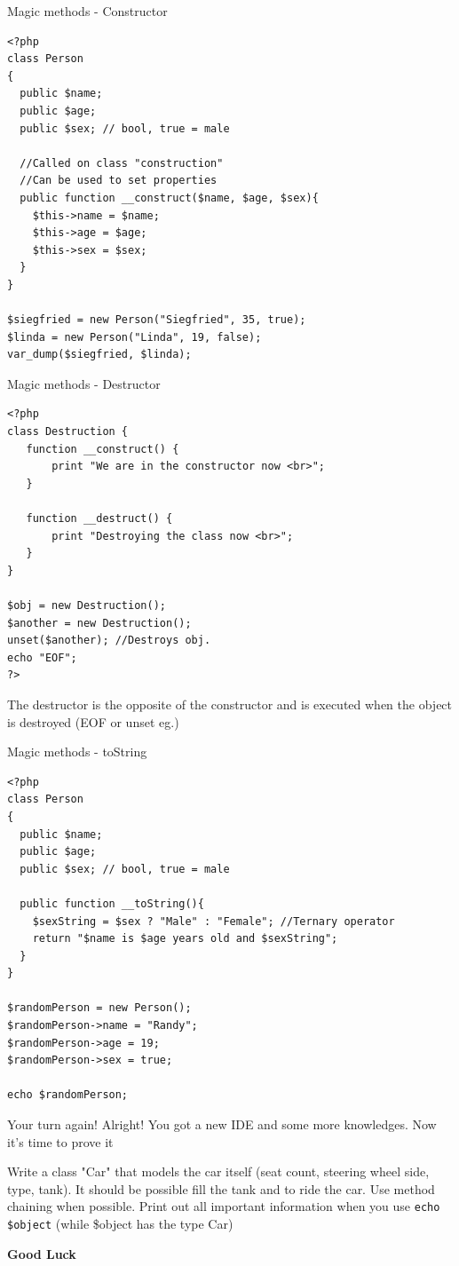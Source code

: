 \begin{frame}[fragile]{Magic methods - Constructor}
\begin{lstlisting}
<?php
class Person
{
  public $name;
  public $age;
  public $sex; // bool, true = male
  
  //Called on class "construction"
  //Can be used to set properties
  public function __construct($name, $age, $sex){
  	$this->name = $name;
  	$this->age = $age;
  	$this->sex = $sex;
  }
}

$siegfried = new Person("Siegfried", 35, true);
$linda = new Person("Linda", 19, false);
var_dump($siegfried, $linda);
\end{lstlisting}
\end{frame}

\begin{frame}[fragile]{Magic methods - Destructor}
\begin{lstlisting}
<?php
class Destruction {
   function __construct() {
       print "We are in the constructor now <br>";
   }

   function __destruct() {
       print "Destroying the class now <br>";
   }
}

$obj = new Destruction();
$another = new Destruction();
unset($another); //Destroys obj.
echo "EOF";
?>
\end{lstlisting}

The destructor is the opposite of the constructor and is executed when the object is destroyed (EOF or unset eg.)
\end{frame}

\begin{frame}[fragile]{Magic methods - toString}
\begin{lstlisting}
<?php
class Person
{
  public $name;
  public $age;
  public $sex; // bool, true = male
  
  public function __toString(){
    $sexString = $sex ? "Male" : "Female"; //Ternary operator
  	return "$name is $age years old and $sexString";
  }
}

$randomPerson = new Person(); 
$randomPerson->name = "Randy";
$randomPerson->age = 19;
$randomPerson->sex = true;

echo $randomPerson;
\end{lstlisting}
\end{frame}


\begin{frame}[fragile]{Your turn again!}
Alright! You got a new IDE and some more knowledges. Now it's time to prove it\pause

Write a class "Car" that models the car itself (seat count, steering wheel side, type, tank). It should be possible fill the tank and to ride the car. Use method chaining when possible. Print out all important information when you use \texttt{echo \$object} (while \$object has the type Car)

\textbf{Good Luck}
\end{frame}


